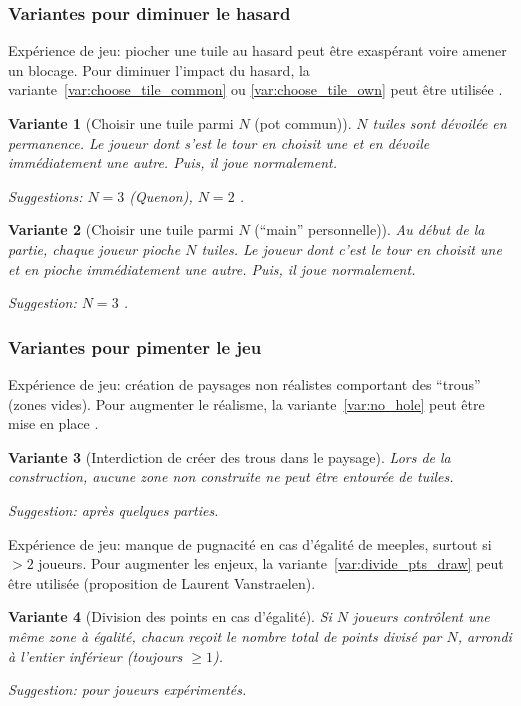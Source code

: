 \documentclass[11pt]{beamer}
\newtheorem{variant}{Variante}
\begin{document}
\begin{frame}
	\frametitle{Variantes pour diminuer le hasard}
	
	Expérience de jeu: piocher une tuile au hasard peut être exaspérant voire amener un blocage.
	Pour diminuer l'impact du hasard, la variante~\ref{var:choose_tile_common} ou \ref{var:choose_tile_own} peut être utilisée \cite{JeuxNim_Carcassonne}.
	
	\begin{variant}[Choisir une tuile parmi $N$ (pot commun)\label{var:choose_tile_common}]
		$N$ tuiles sont dévoilée en permanence.
		Le joueur dont s'est le tour en choisit une et en dévoile immédiatement une autre. Puis, il joue normalement.
		
		Suggestions: $N=3$ (Quenon), $N=2$ \cite{JeuxNim_Carcassonne}.
	\end{variant}

	\begin{variant}[Choisir une tuile parmi $N$ (\enquote{main} personnelle)\label{var:choose_tile_own}]
		Au début de la partie, chaque joueur pioche $N$ tuiles.
		Le joueur dont c'est le tour en choisit une et en pioche immédiatement une autre. Puis, il joue normalement.
		
		Suggestion: $N=3$ \cite{JeuxNim_Carcassonne}.
	\end{variant}
\end{frame}

\begin{frame}
	\frametitle{Variantes pour pimenter le jeu}
	
	Expérience de jeu: création de paysages non réalistes comportant des \enquote{trous} (zones vides).
	Pour augmenter le réalisme, la variante~\ref{var:no_hole} peut être mise en place \cite{JeuxNim_Carcassonne}.
	
	\begin{variant}[Interdiction de créer des trous dans le paysage\label{var:no_hole}]
		Lors de la construction, aucune zone non construite ne peut être entourée de tuiles.
		
		Suggestion: après quelques parties.
	\end{variant}

	Expérience de jeu: manque de pugnacité en cas d'égalité de meeples, surtout si $>2$ joueurs.
	Pour augmenter les enjeux, la variante~\ref{var:divide_pts_draw} peut être utilisée (proposition de Laurent Vanstraelen).
	
	\begin{variant}[Division des points en cas d'égalité\label{var:divide_pts_draw}]
		Si $N$ joueurs contrôlent une même zone à égalité, chacun reçoit le nombre total de points divisé par $N$, arrondi à l'entier inférieur (toujours $\geq 1$).
		
		Suggestion: pour joueurs expérimentés.
	\end{variant}
\end{frame}
\end{document}
